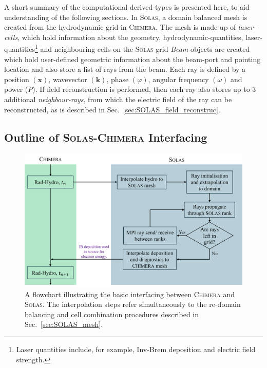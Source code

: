 A short summary of the computational derived-types is presented here, to aid understanding of the following sections.
In \textsc{Solas}, a domain balanced mesh is created from the hydrodynamic grid in \textsc{Chimera}.
The mesh is made up of \textit{laser-cells}, which hold information about the geometry, hydrodynamic-quantities, laser-quantities\footnote{Laser quantities include, for example, \ac{Inv-Brem} deposition and electric field strength.} and neighbouring cells on the \textsc{Solas} grid
\textit{Beam} objects are created which hold user-defined geometric information about the beam-port and pointing location and also store a list of rays from the beam.
Each ray is defined by a position $(\mathbf{x})$, wavevector $(\mathbf{k})$, phase $(\varphi)$, angular frequency $(\omega)$ and power ($P$).
If field reconstruction is performed, then each ray also stores up to 3 additional \textit{neighbour-rays}, from which the electric field of the ray can be reconstructed, as is described in Sec.~\ref{sec:SOLAS_field_reconstruc}.

\subsection{Outline of \textsc{Solas}-\textsc{Chimera} Interfacing}

\begin{figure}[t!]
    \includegraphics[width=0.9\linewidth]{Numerics/Images/raytrace_flowchart.png}
    \centering
    \caption{A flowchart illustrating the basic interfacing between \textsc{Chimera} and \textsc{Solas}.
    The interpolation steps refer simultaneously to the re-domain balancing and cell combination procedures described in Sec.~\ref{sec:SOLAS_mesh}.}%
    \label{fig:raytrace_flowchart}
\end{figure}

